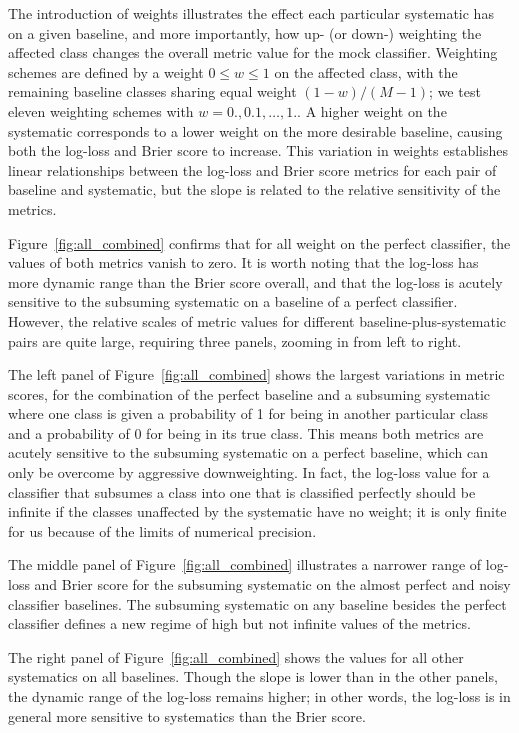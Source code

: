 The introduction of weights illustrates the effect each particular systematic has on a given baseline, and more importantly, how up- (or down-) weighting the affected class changes the overall metric value for the mock classifier.
Weighting schemes are defined by a weight $0 \leq w \leq 1$ on the affected class, with the remaining baseline classes sharing equal weight $(1 - w) / (M - 1)$; we test eleven weighting schemes with $w = 0., 0.1, \dots, 1.$.
A higher weight on the systematic corresponds to a lower weight on the more desirable baseline, causing both the log-loss and Brier score to increase.
This variation in weights establishes linear relationships between the log-loss and Brier score metrics for each pair of baseline and systematic, but the slope is related to the relative sensitivity of the metrics.

Figure~\ref{fig:all_combined} confirms that for all weight on the perfect classifier, the values of both metrics vanish to zero.
It is worth noting that the log-loss has more dynamic range than the Brier score overall, and that the log-loss is acutely sensitive to the subsuming systematic on a baseline of a perfect classifier.
However, the relative scales of metric values for different baseline-plus-systematic pairs are quite large, requiring three panels, zooming in from left to right.

The left panel of Figure~\ref{fig:all_combined} shows the largest variations in metric scores, for the combination of the perfect baseline and a subsuming systematic where one class is given a probability of 1 for being in another particular class and a probability of 0 for being in its true class.
This means both metrics are acutely sensitive to the subsuming systematic on a perfect baseline, which can only be overcome by aggressive downweighting.
In fact, the log-loss value for a classifier that subsumes a class into one that is classified perfectly should be infinite if the classes unaffected by the systematic have no weight; it is only finite for us because of the limits of numerical precision.

The middle panel of Figure~\ref{fig:all_combined} illustrates a narrower range of log-loss and Brier score for the subsuming systematic on the almost perfect and noisy classifier baselines.
The subsuming systematic on any baseline besides the perfect classifier defines a new regime of high but not infinite values of the metrics.

The right panel of Figure~\ref{fig:all_combined} shows the values for all other systematics on all baselines.
Though the slope is lower than in the other panels, the dynamic range of the log-loss remains higher; in other words, the log-loss is in general more sensitive to systematics than the Brier score.

